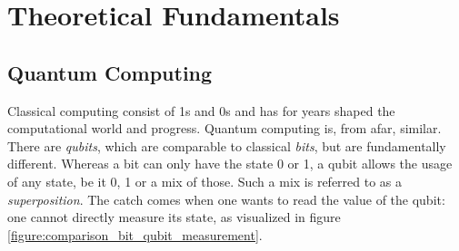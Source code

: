 \chapter{Theoretical Fundamentals} %

\label{chapter:theoretical_fundamentals} %

\def \blochwidth {0.4}
\def \qspherewidth {0.5}
\def \histogramwidth {0.4}
\newcommand{\bloch}{\emph{Bloch}-Sphere}
\newcommand{\qsphere}{Q-Sphere}
\newcommand{\hgate}{$\mathrm{H}$-Gate}

\newcommand{\xgate}{$\mathrm{X}$-Gate}
\newcommand{\ygate}{$\mathrm{Y}$-Gate}
\newcommand{\zgate}{$\mathrm{Z}$-Gate}

\newcommand{\rygate}{$\mathrm{RY}$-Gate}
\newcommand{\rxgate}{$\mathrm{RX}$-Gate}
\newcommand{\rzgate}{$\mathrm{RZ}$-Gate}

\newcommand{\crygate}{$\mathrm{CRY}$-Gate}
\newcommand{\crxgate}{$\mathrm{CRX}$-Gate}
\newcommand{\crzgate}{$\mathrm{CRZ}$-Gate}

\newcommand{\cxgate}{$\mathrm{CX}$-Gate}
\newcommand{\cygate}{$\mathrm{CY}$-Gate}
\newcommand{\czgate}{$\mathrm{CZ}$-Gate}

\newcommand{\frenchquotes}[1]{«~#1~»}

\section{Quantum Computing}
Classical computing consist of 1s and 0s and has for years shaped the computational world and progress. Quantum computing is, from afar, similar. There are \emph{qubits}, which are comparable to classical \emph{bits}, but are fundamentally different. Whereas a bit can only have the state 0 or 1, a qubit allows the usage of any state, be it 0, 1 or a mix of those. Such a mix is referred to as a \emph{superposition}\cite{gudder_superposition_1970}. The catch comes when one wants to read the value of the qubit: one cannot directly measure its state, as visualized in figure \ref{figure:comparison_bit_qubit_measurement}.

